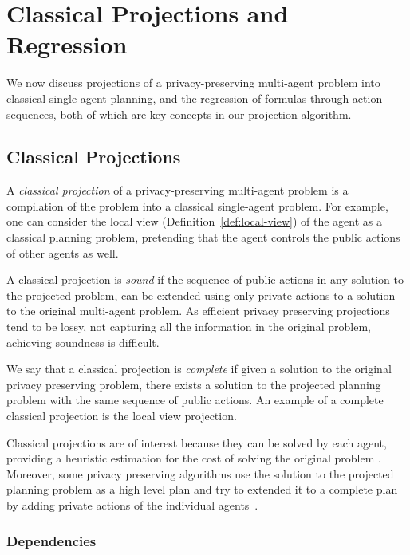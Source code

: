 \documentclass[letterpaper]{article}
\theoremstyle{definition}
\begin{document}
\section{Classical Projections and Regression}

We now discuss projections of a privacy-preserving multi-agent problem into classical single-agent planning, and the regression of formulas through action sequences, both of which are key concepts in our projection algorithm.

\subsection{Classical Projections}


A {\em classical projection} of a privacy-preserving multi-agent problem is a compilation of the problem into a classical single-agent problem. For example, one can consider the local view (Definition~\ref{def:local-view}) of the agent as a classical planning problem, pretending that the agent controls the public actions of other agents as well.

A classical projection is {\em sound} if the sequence of public actions in any solution to the projected problem, can be extended using only private actions  to a solution to the original multi-agent problem. As efficient privacy preserving projections tend to be lossy, not capturing all the information in the original problem, achieving soundness is difficult.

We say that a classical projection is {\em complete} if given a solution to the original privacy preserving problem, there exists a solution to the projected planning problem with the same sequence of public actions. An example of a complete classical projection is the local view projection.


Classical projections are of interest because they can be solved by each agent, providing a heuristic estimation for the cost of solving the original problem \cite{nissim2014distributed}. Moreover, some privacy preserving algorithms use the solution to the projected planning problem as a high level plan and try to extended it to a complete plan by adding private actions of the individual agents~\cite{jakubuv2015multiagent,tozicka2015internally}.






\subsubsection{Dependencies}
\end{document}
